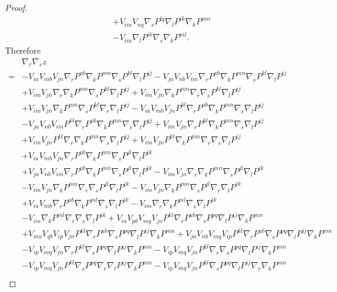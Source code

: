 \documentclass{amsart}
\theoremstyle{definition}
\theoremstyle{remark}
\numberwithin{equation}{section}
\begin{document}
\begin{proof}
\begin{align*}
&+V_{im}V_{nq}\nabla_sP^{lq}\nabla_lP^{ik}\nabla_kP^{mn}\\
&-V_{im}\nabla_lP^{ik}\nabla_s\nabla_kP^{ml}.
\end{align*}
Therefore
\begin{align*}
&\nabla_r\nabla_s z\\
=&-V_{ia}V_{mb}V_{jn}\nabla_r P^{ab}\nabla_kP^{mn}\nabla_s P^{kl}\nabla_l P^{ij}-V_{ja}V_{nb}V_{im}\nabla_r P^{ab}\nabla_kP^{mn}\nabla_s P^{kl}\nabla_l P^{ij}\\
&+V_{im}V_{jn}\nabla_r\nabla_kP^{mn}\nabla_s P^{kl}\nabla_l P^{ij}+V_{im}V_{jn}\nabla_kP^{mn}\nabla_r\nabla_s P^{kl}\nabla_l P^{ij}\\
&+V_{im}V_{jn}\nabla_kP^{mn}\nabla_s P^{kl}\nabla_r\nabla_l P^{ij}-V_{ia}V_{mb}V_{jn}P^{kl}\nabla_rP^{ab}\nabla_kP^{mn}\nabla_s\nabla_l P^{ij}\\
&-V_{ja}V_{nb}V_{im}P^{kl}\nabla_rP^{ab}\nabla_kP^{mn}\nabla_s\nabla_l P^{ij}+V_{im}V_{jn}\nabla_rP^{kl}\nabla_kP^{mn}\nabla_s\nabla_l P^{ij}\\
&+V_{im}V_{jn}P^{kl}\nabla_r\nabla_kP^{mn}\nabla_s\nabla_l P^{ij}+V_{im}V_{jn}P^{kl}\nabla_kP^{mn}\nabla_r\nabla_s\nabla_l P^{ij}\\
&+V_{ia}V_{mb}V_{jn}\nabla_rP^{ab}\nabla_kP^{mn}\nabla_sP^{jl}\nabla_lP^{ik}\\
&+V_{ja}V_{nb}V_{im}\nabla_rP^{ab}\nabla_kP^{mn}\nabla_sP^{jl}\nabla_lP^{ik}-V_{im}V_{jn}\nabla_r\nabla_kP^{mn}\nabla_sP^{jl}\nabla_lP^{ik}\\
&-V_{im}V_{jn}\nabla_kP^{mn}\nabla_r\nabla_sP^{jl}\nabla_lP^{ik}-V_{im}V_{jn}\nabla_kP^{mn}\nabla_sP^{jl}\nabla_r\nabla_lP^{ik}\\
&+V_{ia}V_{mb}\nabla_rP^{ab}\nabla_kP^{ml}\nabla_s\nabla_lP^{ik}-V_{im}\nabla_r\nabla_kP^{ml}\nabla_s\nabla_lP^{ik}\\
&-V_{im}\nabla_kP^{ml}\nabla_r\nabla_s\nabla_lP^{ik}+V_{ia}V_{pb}V_{mq}V_{jn}P^{kl}\nabla_rP^{ab}\nabla_sP^{pq}\nabla_l P^{ij}\nabla_kP^{mn}\\
&+V_{ma}V_{qb}V_{ip}V_{jn}P^{kl}\nabla_rP^{ab}\nabla_sP^{pq}\nabla_l P^{ij}\nabla_kP^{mn}+V_{ja}V_{nb}V_{mq}V_{ip}P^{kl}\nabla_rP^{ab}\nabla_sP^{pq}\nabla_l P^{ij}\nabla_kP^{mn}\\
&-V_{ip}V_{mq}V_{jn}\nabla_rP^{kl}\nabla_sP^{pq}\nabla_l P^{ij}\nabla_kP^{mn}-V_{ip}V_{mq}V_{jn}P^{kl}\nabla_r\nabla_sP^{pq}\nabla_l P^{ij}\nabla_kP^{mn}\\
&-V_{ip}V_{mq}V_{jn}P^{kl}\nabla_sP^{pq}\nabla_r\nabla_l P^{ij}\nabla_kP^{mn}-V_{ip}V_{mq}V_{jn}P^{kl}\nabla_sP^{pq}\nabla_l P^{ij}\nabla_r\nabla_kP^{mn}\\

\end{align*}
\end{proof}
\end{document}
